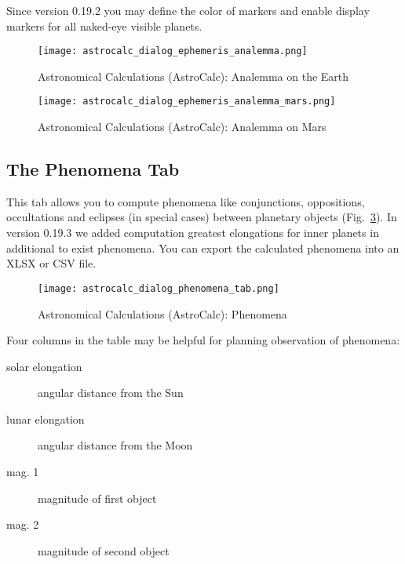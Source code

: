 Since version 0.19.2 you may define the color of markers and enable display markers for all naked-eye visible planets.

\begin{figure}[tbp]
\centering\texttt{[image: astrocalc\_dialog\_ephemeris\_analemma.png]}
\caption{Astronomical Calculations (AstroCalc): Analemma on the Earth}
\label{fig:gui:AstroCalc:Ephemeris:Analemma}
\end{figure}

\begin{figure}[tbp]
\centering\texttt{[image: astrocalc\_dialog\_ephemeris\_analemma\_mars.png]}
\caption{Astronomical Calculations (AstroCalc): Analemma on Mars}
\label{fig:gui:AstroCalc:Ephemeris:AnalemmaMars}
\end{figure}

\newpage
\subsection{The Phenomena Tab}
\label{sec:gui:AstroCalc:Phenomena}

This tab allows you to compute phenomena like conjunctions, oppositions, 
occultations and eclipses (in special cases) between planetary objects 
(Fig.~\ref{fig:gui:AstroCalc:Phenomena}). 
In version 0.19.3 we added computation greatest elongations 
for inner planets in additional to exist phenomena.
You can export the calculated phenomena into an XLSX or CSV file.

\begin{figure}[htbp]
\centering\texttt{[image: astrocalc\_dialog\_phenomena\_tab.png]}
\caption{Astronomical Calculations (AstroCalc): Phenomena}
\label{fig:gui:AstroCalc:Phenomena}
\end{figure}

Four columns in the table may be helpful for planning observation of phenomena:
\begin{description}
  \item[solar elongation] angular distance from the Sun
  \item[lunar elongation] angular distance from the Moon
  \item[mag. 1] magnitude of first object
  \item[mag. 2] magnitude of second object
\end{description}


